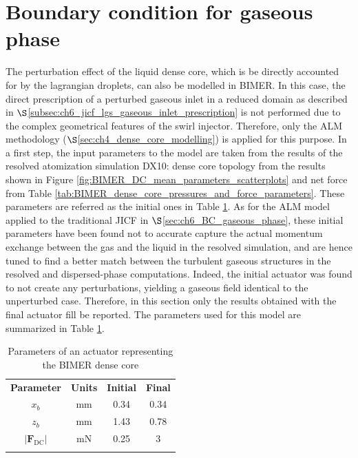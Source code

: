 \section{Boundary condition for gaseous phase}
\label{sec:ch9_BIMER_BCs_for_gaseous_phase}

The perturbation effect of the liquid dense core, which is be directly accounted for by the lagrangian droplets, can also be modelled in BIMER. In this case, the direct prescription of a perturbed gaseous inlet in a reduced domain as described in $\S$\ref{subsec:ch6_jicf_lgs_gaseous_inlet_prescription} is not performed due to the complex geometrical features of the swirl injector. Therefore, only the ALM methodology ($\S$\ref{sec:ch4_dense_core_modelling}) is applied for this purpose. In a first step, the input parameters to the model are taken from the results of the resolved atomization simulation DX10: dense core topology from the results shown in Figure \ref{fig:BIMER_DC_mean_parameters_scatterplots} and net force from Table \ref{tab:BIMER_dense_core_pressures_and_force_parameters}.  These parameters are referred as the initial ones in Table \ref{tab:BIMER_lgs_ALM_parameters}. As for the ALM model applied to the traditional JICF in $\S$\ref{sec:ch6_BC_gaseous_phase}, these initial parameters have been found not to accurate capture the actual momentum exchange between the gas and the liquid in the resolved simulation, and are hence tuned to find a better match between the turbulent gaseous structures in the resolved and dispersed-phase computations. Indeed, the initial actuator was found to not create any perturbations, yielding a gaseous field identical to the unperturbed case. Therefore, in this section only the results obtained with the final actuator fill be reported. The parameters used for this model are summarized in Table \ref{tab:BIMER_lgs_ALM_parameters}. 

\begin{table}[!h]
\centering
\caption{Parameters of an actuator representing the BIMER dense core}
\begin{tabular}{cccc}
\thickhline
\textbf{Parameter} & \textbf{Units} & \textbf{Initial} &  \textbf{Final} \\
\thickhline
$x_b$ & mm & 0.34 & 0.34 \\
$z_b$ & mm & 1.43 & 0.78 \\
$| \textbf{F}_\mathrm{DC} |$ & mN & 0.25  & 3 \\
\thickhline
\end{tabular}
\label{tab:BIMER_lgs_ALM_parameters}
\end{table}

